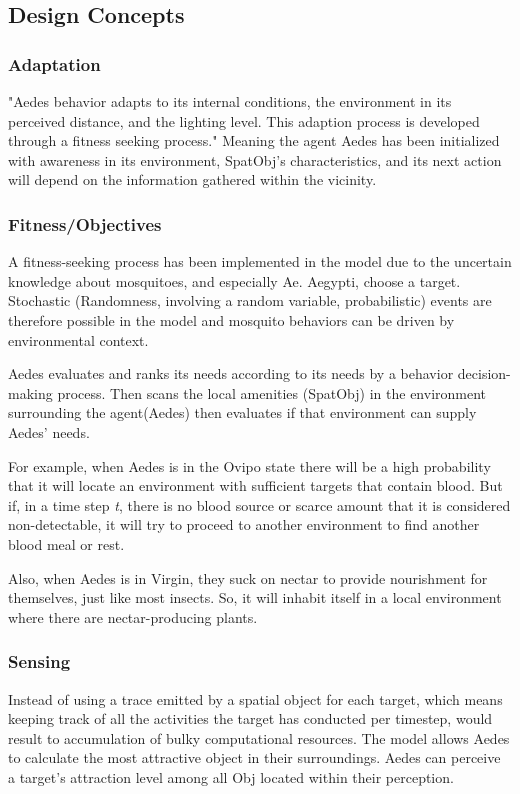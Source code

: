 \subsection{Design Concepts}

\subsubsection{Adaptation}
	"Aedes behavior adapts to its internal conditions, the environment in its perceived distance, and the lighting level. This adaption process is developed through a fitness seeking process." Meaning the agent Aedes has been initialized with awareness in its environment, SpatObj's characteristics, and its next action will depend on the information gathered within the vicinity.
\subsubsection{Fitness/Objectives}{
    A fitness-seeking process \cite{grimm}has been implemented in the model due to the uncertain knowledge about mosquitoes, and especially Ae. Aegypti, choose a target. Stochastic (Randomness, involving a random variable, probabilistic) events are therefore possible in the model and mosquito behaviors can be driven by environmental context.
    
	Aedes evaluates and ranks its needs according to its needs by a behavior decision-making process. Then scans the local amenities (SpatObj) in the environment surrounding the agent(Aedes) then evaluates if that environment can supply Aedes' needs.
	
	For example, when Aedes is in the Ovipo state there will be a high probability that it will locate an environment with sufficient targets that contain blood. But if, in a time step \textit{t}, there is no blood source or scarce amount that it is considered non-detectable, it will try to proceed to another environment to find another blood meal or rest.
	
	Also, when Aedes is in Virgin, they suck on nectar to provide nourishment for themselves, just like most insects. So, it will inhabit itself in a local environment where there are nectar-producing plants.

}
\subsubsection{Sensing}
Instead of using a trace emitted by a spatial object for each target\cite{cummins}, which means keeping track of all the activities the target has conducted per timestep, would result to accumulation of bulky computational resources. The model allows Aedes to calculate the most attractive object in their surroundings. Aedes can perceive a target’s attraction level among all 
Obj located within their perception.


